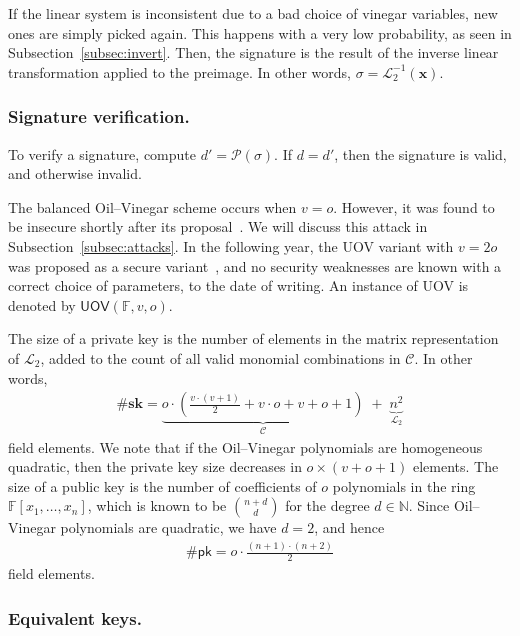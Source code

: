 \documentclass[draft, 12pt, a4paper, oneside]{memoir}
\theoremstyle{definition}
\begin{document}
If the linear system is inconsistent due to a bad choice of vinegar variables, new ones are simply picked again. This happens with a very low probability, as seen in Subsection~\ref{subsec:invert}. Then, the signature is the result of the inverse linear transformation applied to the preimage. In other words, $\sigma = \mathcal{L}_{2}^{-1}(\mathbf{x})$.

\subsubsection{Signature verification.}

To verify a signature, compute $d' = \mathcal{P}(\sigma)$. If $d = d'$, then the signature is valid, and otherwise invalid.

The balanced Oil--Vinegar scheme occurs when $v = o$. However, it was found to be insecure shortly after its proposal~\cite{Kipnis:199808}. We will discuss this attack in Subsection~\ref{subsec:attacks}. In the following year, the UOV variant with $v = 2o$ was proposed as a secure variant~\cite{Kipnis:199904}, and no security weaknesses are known with a correct choice of parameters, to the date of writing. An instance of UOV is denoted by $\mathsf{UOV}(\mathbb{F},v, o)$. 

The size of a private key is the number of elements in the matrix representation of $\mathcal{L}_{2}$, added to the count of all valid monomial combinations in $\mathcal{C}$. In other words,
\begin{align}
  \#\mathbf{sk} = \underbrace{o \cdot \left( \frac{v \cdot (v + 1)}{2} + v \cdot o + v + o + 1 \right)}_{\mathcal{C}} \;
    + \; \underbrace{n^{2}}_{\mathcal{L}_{2}}
\end{align}
field elements. We note that if the Oil--Vinegar polynomials are homogeneous quadratic, then the private key size decreases in $o \times (v + o + 1)$ elements. The size of a public key is the number of coefficients of $o$ polynomials in the ring $\mathbb{F}[x_{1}, \dots, x_{n}]$, which is known to be $\binom{n + d}{d}$ for the degree $d \in \mathbb{N}$. Since Oil--Vinegar polynomials are quadratic, we have $d = 2$, and hence
\begin{align}
  \#\mathsf{pk} = o \cdot \frac{(n + 1) \cdot (n + 2)}{2}
\end{align}
field elements.

\subsubsection{Equivalent keys.}
\end{document}
